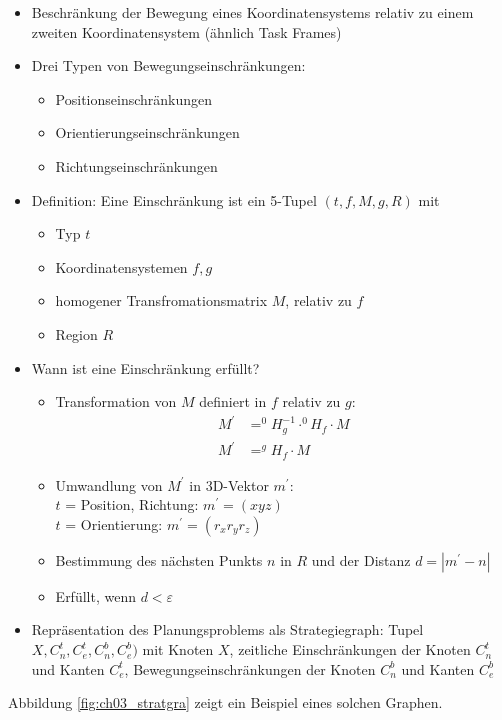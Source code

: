 \begin{itemize}
\item Beschränkung der Bewegung eines Koordinatensystems relativ zu einem zweiten Koordinatensystem (ähnlich \Gu Task Frames\Go) 
\item Drei Typen von Bewegungseinschränkungen:
\begin{itemize}
\item Positionseinschränkungen
\item Orientierungseinschränkungen
\item Richtungseinschränkungen
\end{itemize}
\item Definition: Eine Einschränkung ist ein 5-Tupel $(t, f, M, g, R)$ mit
\begin{itemize}
\item Typ $t$
\item Koordinatensystemen $f, g$
\item homogener Transfromationsmatrix $M$, relativ zu $f$
\item Region $R$
\end{itemize}
\item Wann ist eine Einschränkung erfüllt?
\begin{itemize}
\item Transformation von $M$ definiert in $f$ relativ zu $g$:
\begin{align*}
M^\prime &= ^0H_g^{-1} \cdot ^0 H_f \cdot M\\
M^\prime &= ^g H_f \cdot M
\end{align*}
\item Umwandlung von $M^\prime$ in 3D-Vektor $m^\prime$:\\
$t$ = Position, Richtung: $m^\prime = (x y z)$\\
$t$ = Orientierung: $m^\prime = (r_x r_y r_z )$
\item Bestimmung des nächsten Punkts $n$ in $R$ und der Distanz $d = | m^\prime - n |$
\item Erfüllt, wenn $d < \varepsilon$
\end{itemize}
\item Repräsentation des Planungsproblems als \Gu Strategiegraph\Go :
Tupel $X, C^t_n, C^t_e, C^b_n, C^b_e)$ mit Knoten $X$, zeitliche Einschränkungen der Knoten $C^t_n$ und Kanten $C^t_e$,
Bewegungseinschränkungen der Knoten $C^b_n$ und Kanten $C^b_e$
\end{itemize}
Abbildung \ref{fig:ch03_stratgra} zeigt ein Beispiel eines solchen Graphen.
